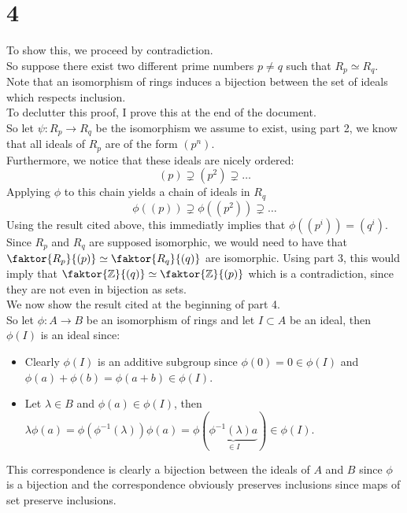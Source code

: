 \documentclass[11pt, a4paper]{article}
\begin{document}
\section*{4}
To show this, we proceed by contradiction.\\
So suppose there exist two different prime numbers $p\neq q$ such that $R_p\simeq R_q$.\\
Note that an isomorphism of rings induces a bijection between the set of ideals which respects inclusion.\\
To declutter this proof, I prove this at the end of the document.\\
So let $\psi: R_p\to R_q$ be the isomorphism we assume to exist, using part 2, we know that all ideals of $R_p$ are of the form $( p^{n}) $.\\
Furthermore, we notice that these ideals are nicely ordered:
\[ 
	( p) \supsetneq ( p^{2}) \supsetneq \ldots 
\]
Applying $\phi$ to this chain yields a chain of ideals in $ R_q$ 
\[ 
	\phi( ( p )) \supsetneq \phi( (  p^{2} )) \supsetneq \ldots
\]
Using the result cited above, this immediatly implies that $\phi( ( p^{i}) ) = ( q^{i})  $.\\
Since $R_p$ and $R_q$ are supposed isomorphic, we would need to have that $ \faktor { R_p} { ( p) } \simeq \faktor { R_q} { ( q) } $ are isomorphic. Using part 3, this would imply that $ \faktor { \mathbb{Z}} { ( q) }\simeq \faktor { \mathbb{Z}} { ( p) } $ which is a contradiction, since they are not even in bijection as sets.\\

We now show the result cited at the beginning of part 4.\\
So let $ \phi: A \to B $ be an isomorphism of rings and let $I \subset A$ be an ideal, then $\phi( I) $ is an ideal since:
\begin{itemize}
\item Clearly $\phi( I) $ is an additive subgroup since $\phi( 0) = 0 \in \phi( I) $ and $\phi( a) + \phi( b) = \phi( a+b) \in\phi( I) $.
\item Let $\lambda\in B$ and $\phi( a) \in \phi( I) $, then $ \lambda\phi( a) = \phi( \phi^{-1}( \lambda) ) \phi( a) = \phi( \underbrace{\phi^{-1}( \lambda) a}_{\in I	})\in \phi( I)$. 
\end{itemize}
This correspondence is clearly a bijection between the ideals of $A$ and $B$ since $\phi$ is a bijection and the correspondence obviously preserves inclusions since maps of set preserve inclusions.
\end{document}
